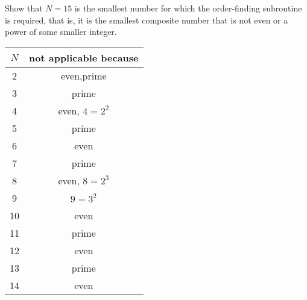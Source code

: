  Show that $N=15$ is the smallest number for which the order-finding subroutine is required, that is, it is the smallest composite number that is not even or a power of some smaller integer.
\Soln 
\begin{center}
\begin{tabular}{|c|c|}
\hline
$N$ & not applicable because \\
\hline
\hline
2 & even,prime \\
\hline
3 & prime \\
\hline
4 & even, $4=2^2$ \\
\hline
5 & prime \\
\hline
6 & even \\
\hline
7 & prime  \\
\hline
8 & even, $8=2^3$  \\
\hline
9 & $9 = 3^2$ \\
\hline
10 & even \\
\hline
11 & prime \\
\hline
12 & even \\
\hline
13 & prime \\
\hline
14 & even \\
\hline
\end{tabular}
\end{center}

